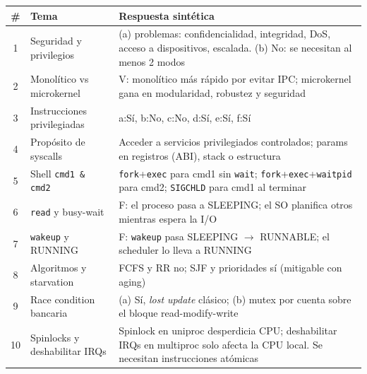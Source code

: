 \documentclass[11pt,a4paper]{article}
\begin{document}
\begin{center}
\footnotesize
\begin{tabular}{@{}clp{9cm}@{}}
\toprule
\# & Tema & Respuesta sintética \\
\midrule
1  & Seguridad y privilegios     & (a) problemas: confidencialidad, integridad, DoS, acceso a dispositivos, escalada. (b) No: se necesitan al menos 2 modos \\
2  & Monolítico vs microkernel   & V: monolítico más rápido por evitar IPC; microkernel gana en modularidad, robustez y seguridad \\
3  & Instrucciones privilegiadas & a:Sí, b:No, c:No, d:Sí, e:Sí, f:Sí \\
4  & Propósito de syscalls       & Acceder a servicios privilegiados controlados; params en registros (ABI), stack o estructura \\
5  & Shell \texttt{cmd1 \& cmd2} & \texttt{fork}+\texttt{exec} para cmd1 sin \texttt{wait}; \texttt{fork}+\texttt{exec}+\texttt{waitpid} para cmd2; \texttt{SIGCHLD} para cmd1 al terminar \\
6  & \texttt{read} y busy-wait   & F: el proceso pasa a SLEEPING; el SO planifica otros mientras espera la I/O \\
7  & \texttt{wakeup} y RUNNING   & F: \texttt{wakeup} pasa SLEEPING $\to$ RUNNABLE; el scheduler lo lleva a RUNNING \\
8  & Algoritmos y starvation     & FCFS y RR no; SJF y prioridades sí (mitigable con aging) \\
9  & Race condition bancaria     & (a) Sí, \emph{lost update} clásico; (b) mutex por cuenta sobre el bloque read-modify-write \\
10 & Spinlocks y deshabilitar IRQs & Spinlock en uniproc desperdicia CPU; deshabilitar IRQs en multiproc solo afecta la CPU local. Se necesitan instrucciones atómicas \\
\bottomrule
\end{tabular}
\end{center}
\end{document}
